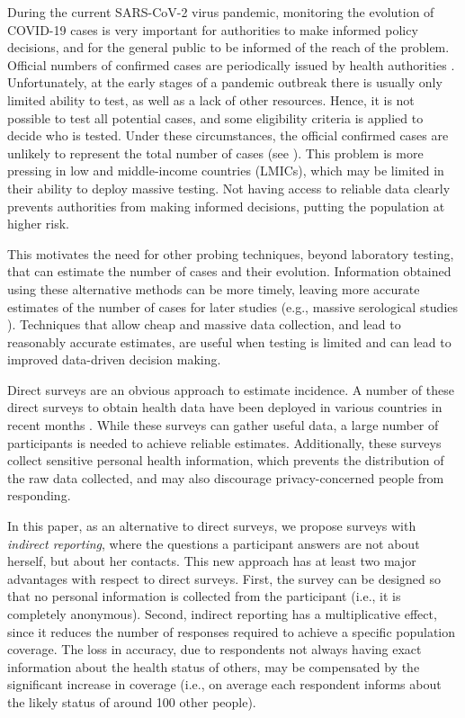 \documentclass[sigconf,authordraft]{acmart}
\begin{document}
During the current SARS-CoV-2 virus pandemic, monitoring the evolution of COVID-19 cases is very important for authorities to make
informed policy decisions, and for the general public to be informed of the reach of the problem. 
Official numbers of confirmed cases are periodically issued by health authorities \cite{ECDC}. 
Unfortunately, at the early stages of a pandemic outbreak  there is usually only limited ability to test, as well as a lack of other resources. Hence, it is not possible to test all potential cases, and some eligibility criteria is applied to decide who is tested.
Under these circumstances, the official confirmed cases are unlikely to represent the total number of cases (see \cite{maxmen2020much}).
This problem is more pressing in low and middle-income countries (LMICs), which may be limited in their ability to deploy massive testing.
Not having access to reliable data clearly prevents authorities from making informed decisions, putting the population at higher risk.

This motivates the need for other probing techniques, beyond laboratory testing, that can estimate  the number of cases and their evolution. Information obtained using these alternative methods can be more timely, leaving more accurate estimates of the number of cases for later studies  (e.g.,  massive serological studies \cite{yang2012serological}).  Techniques that allow cheap and massive data collection, and lead to reasonably accurate estimates, 
are useful when testing is limited and can lead to improved data-driven decision making. 

Direct surveys are an obvious approach to estimate incidence. A number of these direct surveys to obtain health data have been deployed in various countries in recent months \cite{linares1920estimando,oliver2020covid19impact,FB-survey}. While these surveys can gather  useful data, a large number of participants is needed to achieve reliable estimates. Additionally, these surveys collect sensitive personal health information, which prevents the distribution of the raw data collected, and may also discourage privacy-concerned people from responding.

In this paper, as an alternative to direct surveys, we propose surveys with \textit{indirect reporting}, where the questions a participant answers are not about herself, but about her contacts. 
This new approach has at least two major advantages with respect to direct surveys. First, the survey can be designed so that no personal information is collected from the participant (i.e., it is completely anonymous). Second, indirect reporting has a multiplicative effect, since it reduces the number of responses required to achieve a specific population coverage. The loss in accuracy, due to respondents not always having exact information about the health status of others, may be compensated by the significant increase in coverage (i.e., on average each respondent informs about the likely status of around 100 other people).   
\end{document}
